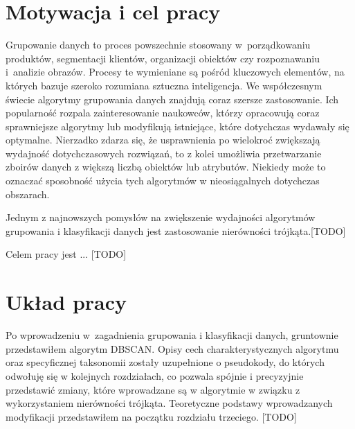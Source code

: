 \section[Motywacja i cel pracy][Motywacja i cel pracy]{Motywacja i cel pracy}

Grupowanie danych to proces powszechnie stosowany w~porządkowaniu produktów, segmentacji klientów, organizacji obiektów czy rozpoznawaniu i~analizie obrazów. Procesy te wymieniane są pośród kluczowych elementów, na których bazuje szeroko rozumiana sztuczna inteligencja. We współczesnym świecie algorytmy grupowania danych znajdują coraz szersze zastosowanie. Ich popularność rozpala zainteresowanie naukowców, którzy opracowują coraz sprawniejsze algorytmy lub modyfikują istniejące, które dotychczas wydawały się optymalne. Nierzadko zdarza się, że usprawnienia po wielokroć zwiększają wydajność dotychczasowych rozwiązań, to z kolei umożliwia przetwarzanie zboirów danych z większą liczbą obiektów lub atrybutów. Niekiedy może to oznaczać sposobność użycia tych algorytmów w nieosiągalnych dotychczas obszarach.

Jednym z najnowszych pomysłów na zwiększenie wydajności algorytmów grupowania i klasyfikacji danych jest zastosowanie nierówności trójkąta.[TODO]

Celem pracy jest ... [TODO]

\section[Układ pracy][Układ pracy]{Układ pracy}
Po wprowadzeniu w~zagadnienia grupowania i klasyfikacji danych, gruntownie przedstawiłem algorytm DBSCAN. Opisy cech charakterystycznych algorytmu oraz specyficznej taksonomii zostały uzupełnione o pseudokody, do których odwołuję się w kolejnych rozdziałach, co pozwala spójnie i precyzyjnie przedstawić zmiany, które wprowadzane są w algorytmie w związku z wykorzystaniem nierówności trójkąta. Teoretyczne podstawy wprowadzanych modyfikacji przedstawiłem na początku rozdziału trzeciego. [TODO]